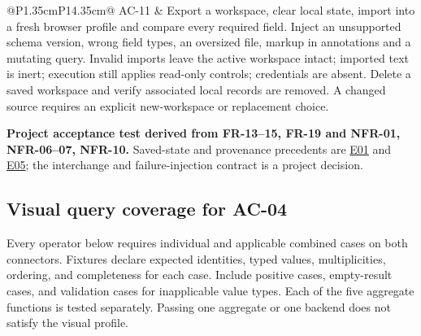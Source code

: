 \documentclass[11pt,a4paper]{article}
\newcommand{\evidence}[1]{\hyperlink{evidence:#1}{#1}}
\begin{document}
{\begin{longtable}{@{}P{1.35cm}P{14.35cm}@{}}
AC-11 & Export a workspace, clear local state, import into a fresh browser profile and compare every required field. Inject an unsupported schema version, wrong field types, an oversized file, markup in annotations and a mutating query. Invalid imports leave the active workspace intact; imported text is inert; execution still applies read-only controls; credentials are absent. Delete a saved workspace and verify associated local records are removed. A changed source requires an explicit new-workspace or replacement choice.\par\smallskip \textbf{Project acceptance test derived from FR-13--15, FR-19 and NFR-01, NFR-06--07, NFR-10.} Saved-state and provenance precedents are \evidence{E01} and \evidence{E05}; the interchange and failure-injection contract is a project decision.\\
\end{longtable}}

\subsection{Visual query coverage for AC-04}
Every operator below requires individual and applicable combined cases on both connectors. Fixtures declare expected identities, typed values, multiplicities, ordering, and completeness for each case. Include positive cases, empty-result cases, and validation cases for inapplicable value types. Each of the five aggregate functions is tested separately. Passing one aggregate or one backend does not satisfy the visual profile.
\end{document}
